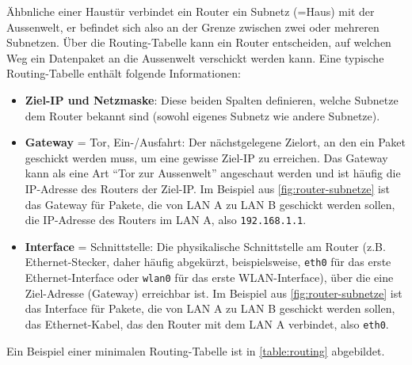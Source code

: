 Ähbnliche einer Haustür verbindet ein Router ein Subnetz (=Haus) mit der Aussenwelt, er befindet sich also an der Grenze zwischen zwei oder mehreren Subnetzen. Über die Routing-Tabelle kann ein Router entscheiden, auf welchen Weg ein Datenpaket an die Aussenwelt verschickt werden kann. Eine typische Routing-Tabelle enthält folgende Informationen:

\begin{itemize}
	\item \textbf{Ziel-\gls{IP} und Netzmaske}: Diese beiden Spalten definieren, welche Subnetze dem Router bekannt sind (sowohl eigenes Subnetz wie andere Subnetze).
	\item \textbf{Gateway} = Tor, Ein-/Ausfahrt: Der nächstgelegene Zielort, an den ein Paket geschickt werden muss, um eine gewisse Ziel-\gls{IP} zu erreichen. Das Gateway kann als eine Art \enquote{Tor zur Aussenwelt} angeschaut werden und ist häufig die \gls{IP}-Adresse des Routers der Ziel-\gls{IP}. Im Beispiel aus \cref{fig:router-subnetze} ist das Gateway für Pakete, die von \gls{LAN} A zu \gls{LAN} B geschickt werden sollen, die \gls{IP}-Adresse des Routers im \gls{LAN} A, also \texttt{192.168.1.1}.
	\item \textbf{Interface} = Schnittstelle: Die physikalische Schnittstelle am Router (z.B. Ethernet-Stecker, daher häufig abgekürzt, beispielsweise, \texttt{eth0} für das erste Ethernet-Interface oder \texttt{wlan0} für das erste \gls{WLAN}-Interface), über die eine Ziel-Adresse (Gateway) erreichbar ist. Im Beispiel aus \cref{fig:router-subnetze} ist das Interface für Pakete, die von \gls{LAN} A zu \gls{LAN} B geschickt werden sollen, das Ethernet-Kabel, das den Router mit dem \gls{LAN} A verbindet, also \texttt{eth0}.
\end{itemize}

Ein Beispiel einer minimalen Routing-Tabelle ist in \cref{table:routing} abgebildet.


